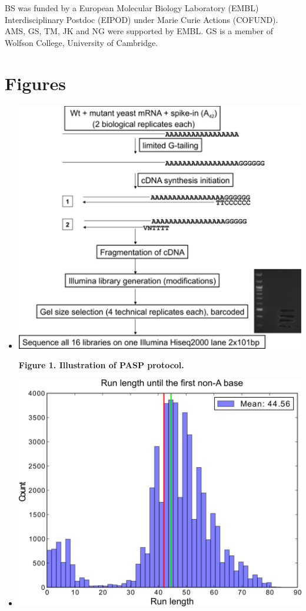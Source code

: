 \documentclass[10pt]{article}
\begin{document}
BS was funded by a European Molecular Biology Laboratory (EMBL) Interdisciplinary Postdoc (EIPOD) under Marie Curie Actions (COFUND). AMS, GS, TM, JK and NG were supported by EMBL.  GS is a member of Wolfson College, University of Cambridge.

 
\section*{Figures}
\vspace{1cm}

\begin{itemize}
\item[]{
\begin{center}
\includegraphics[scale=1.75]{Figure1.png}
\end{center}

\textbf{Figure 1. Illustration of PASP protocol.}
}
\newpage

\item[]{
\begin{center}
\includegraphics[scale=1.5]{Figure2.png}
\end{center}

}
\end{itemize}
\end{document}
